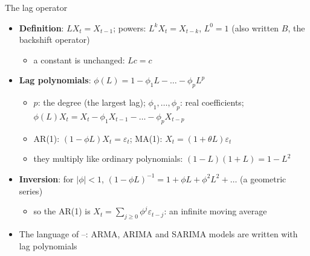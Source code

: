\begin{frame}{The lag operator}
\itemsize{\small}
\begin{itemize}
    \item \textbf{Definition}: $LX_t = X_{t-1}$; powers: $L^kX_t = X_{t-k}$, $L^0 = 1$ (also written $B$, the backshift operator)
    \begin{itemize}
        \item a constant is unchanged: $Lc = c$
    \end{itemize}
    \item \textbf{Lag polynomials}: $\phi(L) = 1 - \phi_1L - \dots - \phi_pL^p$
    \begin{itemize}
        \item $p$: the degree (the largest lag); $\phi_1, \dots, \phi_p$: real coefficients; $\phi(L)X_t = X_t - \phi_1X_{t-1} - \dots - \phi_pX_{t-p}$
        \item AR(1): $(1 - \phi L)X_t = \varepsilon_t$; MA(1): $X_t = (1 + \theta L)\varepsilon_t$
        \item they multiply like ordinary polynomials: $(1 - L)(1 + L) = 1 - L^2$
    \end{itemize}
    \item \textbf{Inversion}: for $|\phi| < 1$, $(1 - \phi L)^{-1} = 1 + \phi L + \phi^2L^2 + \dots$ (a geometric series)
    \begin{itemize}
        \item so the AR(1) is $X_t = \sum_{j \ge 0}\phi^j\varepsilon_{t-j}$: an infinite moving average
    \end{itemize}
    \item The language of --: ARMA, ARIMA and SARIMA models are written with lag polynomials
\end{itemize}
\end{frame}

